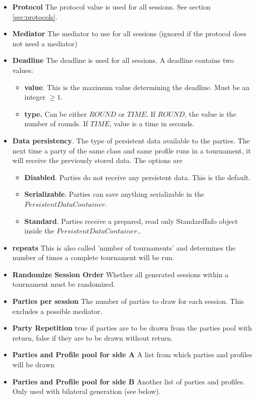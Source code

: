 \documentclass[]{llncs}
\begin{document}
\begin{itemize}
\item \textbf{Protocol} The protocol value is used for all sessions. See section \ref{sec:protocols}.
\item \textbf{Mediator} The mediator to use for all sessions (ignored if the protocol does not need a mediator)
\item \textbf{Deadline} The deadline is used for all sessions.  A deadline contains two values:
     \begin{itemize}
        \item \textbf{value}. This is the maximum value determining the deadline. Must be an integer $\ge 1$.
        \item \textbf{type.} Can be either $ROUND$ or $TIME$. If $ROUND$, the value is the number of rounds. If $TIME$, value is a time in seconds.
      \end{itemize}
\item \textbf{Data persistency}. The type of persistent data available to the parties. The next time a party of the same class and same profile runs in a tournament, it will receive the previously stored data. The options are 
	\begin{itemize}
	\item \textbf{Disabled}. Parties do not receive any persistent data. This is the default.
	\item \textbf{Serializable}. Parties can save anything serializable in the $PersistentDataContainer$.
	\item \textbf{Standard}. Parties receive a prepared, read only StandardInfo object inside the $PersistentDataContainer$.. 
	\end{itemize}
\item \textbf{repeats} This is also called 'number of tournaments' and determines the number of times a complete tournament will be run.
\item \textbf{Randomize Session Order} Whether all generated sessions within a tournament must be randomized.
\item \textbf{Parties per session} The number of parties to draw for each session. This excludes a possible mediator.
\item \textbf{Party Repetition} true if parties are to be drawn from the parties pool with return, false if they are to be drawn without return.
\item \textbf{Parties and Profile pool for side A}  A list from which parties and profiles will be drawn
\item \textbf{Parties and Profile pool for side B} Another list of parties and profiles. Only used with bilateral generation (see below).
\end{itemize}
\end{document}
